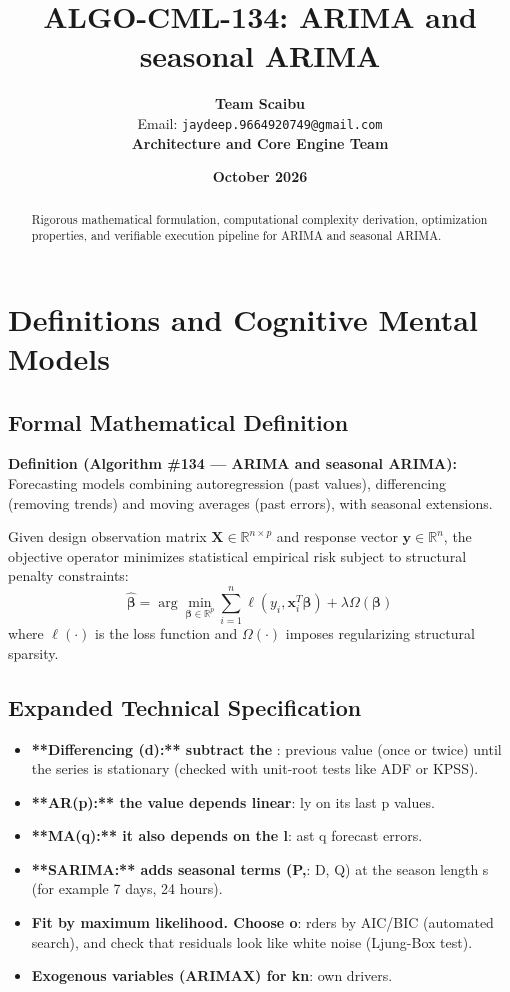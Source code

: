 \documentclass[11pt,a4paper]{article}
\title{\textbf{ALGO-CML-134: ARIMA and seasonal ARIMA}}
\author{\textbf{Team Scaibu} \\ \small Email: \texttt{jaydeep.9664920749@gmail.com} \\ \small \textbf{Architecture and Core Engine Team}}
\date{\textbf{October 2026}}
\theoremstyle{definition}
\begin{document}
\maketitle

\begin{abstract}
Rigorous mathematical formulation, computational complexity derivation, optimization properties, and verifiable execution pipeline for ARIMA and seasonal ARIMA.
\end{abstract}

\section{Definitions and Cognitive Mental Models}

\subsection{Formal Mathematical Definition}
\textbf{Definition (Algorithm \#134 --- ARIMA and seasonal ARIMA):}
Forecasting models combining autoregression (past values), differencing (removing trends) and moving averages (past errors), with seasonal extensions.

Given design observation matrix $\mathbf{X} \in \mathbb{R}^{n \times p}$ and response vector $\mathbf{y} \in \mathbb{R}^n$, the objective operator minimizes statistical empirical risk subject to structural penalty constraints:
\begin{equation}
\hat{\boldsymbol{\beta}} = \arg\min_{\boldsymbol{\beta} \in \mathbb{R}^p} \sum_{i=1}^n \ell(y_i, \mathbf{x}_i^T \boldsymbol{\beta}) + \lambda \Omega(\boldsymbol{\beta})
\end{equation}
where $\ell(\cdot)$ is the loss function and $\Omega(\cdot)$ imposes regularizing structural sparsity.

\subsection{Expanded Technical Specification}
\begin{itemize}
\item \textbf{**Differencing (d):** subtract the }: previous value (once or twice) until the series is stationary (checked with unit-root tests like ADF or KPSS).
\item \textbf{**AR(p):** the value depends linear}: ly on its last p values.
\item \textbf{**MA(q):** it also depends on the l}: ast q forecast errors.
\item \textbf{**SARIMA:** adds seasonal terms (P,}:  D, Q) at the season length s (for example 7 days, 24 hours).
\item \textbf{Fit by maximum likelihood. Choose o}: rders by AIC/BIC (automated search), and check that residuals look like white noise (Ljung-Box test).
\item \textbf{Exogenous variables (ARIMAX) for kn}: own drivers.
\end{itemize}
\end{document}
